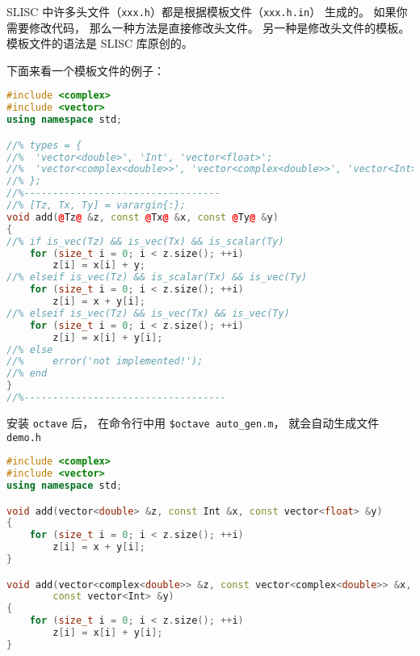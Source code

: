 
\begin{issues}
\issueDraft
\end{issues}


SLISC 中许多头文件（\verb|xxx.h|）都是根据模板文件（\verb|xxx.h.in|） 生成的。 如果你需要修改代码， 那么一种方法是直接修改头文件。 另一种是修改头文件的模板。 模板文件的语法是 SLISC 库原创的。

下面来看一个模板文件的例子：
\begin{lstlisting}[language=cpp, caption=demo.h.in]
#include <complex>
#include <vector>
using namespace std;

//% types = {
//%  'vector<double>', 'Int', 'vector<float>';
//%  'vector<complex<double>>', 'vector<complex<double>>', 'vector<Int>';
//% };
//%----------------------------------
//% [Tz, Tx, Ty] = varargin{:};
void add(@Tz@ &z, const @Tx@ &x, const @Ty@ &y)
{
//% if is_vec(Tz) && is_vec(Tx) && is_scalar(Ty)
	for (size_t i = 0; i < z.size(); ++i)
		z[i] = x[i] + y;
//% elseif is_vec(Tz) && is_scalar(Tx) && is_vec(Ty)
	for (size_t i = 0; i < z.size(); ++i)
		z[i] = x + y[i];
//% elseif is_vec(Tz) && is_vec(Tx) && is_vec(Ty)
	for (size_t i = 0; i < z.size(); ++i)
		z[i] = x[i] + y[i];
//% else
//%     error('not implemented!');
//% end
}
//%-----------------------------------
\end{lstlisting}

安装 \verb|octave| 后， 在命令行中用 \verb`$octave auto_gen.m`， 就会自动生成文件 \verb`demo.h`
\begin{lstlisting}[language=cpp]
#include <complex>
#include <vector>
using namespace std;

void add(vector<double> &z, const Int &x, const vector<float> &y)
{
	for (size_t i = 0; i < z.size(); ++i)
		z[i] = x + y[i];
}

void add(vector<complex<double>> &z, const vector<complex<double>> &x,
        const vector<Int> &y)
{
	for (size_t i = 0; i < z.size(); ++i)
		z[i] = x[i] + y[i];
}
\end{lstlisting}
